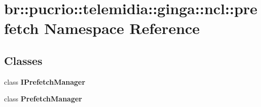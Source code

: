 \section{br::pucrio::telemidia::ginga::ncl::prefetch Namespace Reference}
\label{namespacebr_1_1pucrio_1_1telemidia_1_1ginga_1_1ncl_1_1prefetch}


\subsection*{Classes}
\begin{CompactItemize}
\item 
class {\bf IPrefetchManager}
\item 
class {\bf PrefetchManager}
\end{CompactItemize}

